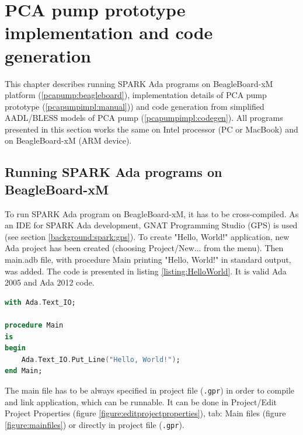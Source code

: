 
\cleardoublepage


\chapter{PCA pump prototype implementation and code generation}
\label{pcapumpimpl}

This chapter describes running SPARK Ada programs on BeagleBoard-xM platform (\ref{pcapump:beagleboard}), implementation details of PCA pump prototype (\ref{pcapumpimpl:manual})) and code generation from simplified AADL/BLESS models of PCA pump (\ref{pcapumpimpl:codegen}). All programs presented in this section works the same on Intel processor (PC or MacBook) and on BeagleBoard-xM (ARM device).


\section{Running SPARK Ada programs on BeagleBoard-xM}
\label{pcapumpimpl:beagleboard}

To run SPARK Ada program on BeagleBoard-xM, it has to be cross-compiled. As an IDE for SPARK Ada development, GNAT Programming Studio (GPS) is used (see section \ref{background:spark:gps}). To create "Hello, World!" application, new Ada project has been created (choosing Project/New... from the menu). Then main.adb file, with procedure Main printing "Hello, World!" in standard output, was added. The code is presented in listing \ref{listing:HelloWorld}. It is valid Ada 2005 and Ada 2012 code.

\begin{lstlisting}[language=ada, frame=single, gobble=0, caption={"Hello World" in Ada}, label={listing:HelloWorld}]
with Ada.Text_IO;

procedure Main
is
begin
    Ada.Text_IO.Put_Line("Hello, World!");    
end Main;
\end{lstlisting} 


The main file has to be always specified in project file (\lstinline{.gpr}) in order to compile and link application, which can be runnable. It can be done in Project/Edit Project Properties (figure \ref{figure:editprojectproperties}), tab: Main files (figure \ref{figure:mainfiles}) or directly in project file (\lstinline{.gpr}).

